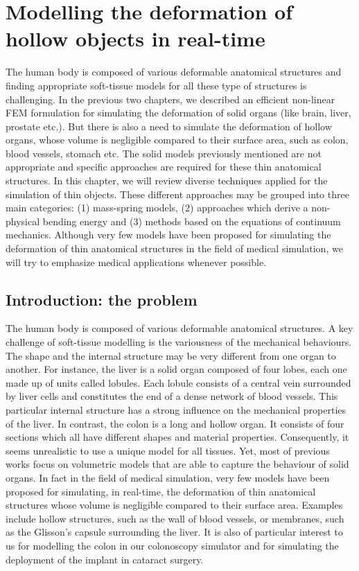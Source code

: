 \chapter[Modelling the deformation of hollow objects in real-time][Modelling hollow objects in real-time]{Modelling the deformation of hollow objects in real-time}
\label{chap7}
\begin{shortAbstract}
The human body is composed of various deformable anatomical structures and finding appropriate soft-tissue models for all these type of structures is challenging. In the previous two chapters, we described an efficient non-linear FEM formulation for simulating the deformation of solid organs (like brain, liver, prostate etc.). But there is also a need to simulate the deformation of hollow organs, whose volume is negligible compared to their surface area, such as colon, blood vessels, stomach etc. The solid models previously mentioned are not appropriate and specific approaches are required for these thin anatomical structures. In this chapter, we will review diverse techniques applied for the simulation of thin objects. These different approaches may be grouped into three main categories: (1) mass-spring models, (2) approaches which derive a non-physical bending energy and (3) methods based on the equations of continuum mechanics. Although very few models have been proposed for simulating the deformation of thin anatomical structures in the field of medical simulation, we will try to emphasize medical applications whenever possible. 
\end{shortAbstract}


\section{Introduction: the problem}
The human body is composed of various deformable anatomical structures. A key challenge of soft-tissue modelling is the variousness of the mechanical behaviours. The shape and the internal structure may be very different from one organ to another. For instance, the liver is a solid organ composed of four lobes, each one made up of units called lobules. Each lobule consists of a central vein surrounded by liver cells and constitutes the end of a dense network of blood vessels. This particular internal structure has a strong influence on the mechanical properties of the liver. In contrast, the colon is a long and hollow organ. It consists of four sections which all have different shapes and material properties. Consequently, it seems unrealistic to use a unique model for all tissues. Yet, most of previous works focus on volumetric models that are able to capture the behaviour of solid organs. In fact in the field of medical simulation, very few models have been proposed for simulating, in real-time, the deformation of thin anatomical structures whose volume is negligible compared to their surface area. Examples include hollow structures, such as the wall of blood vessels, or membranes, such as the Glisson's capsule surrounding the liver. It is also of particular interest to us for modelling the colon in our colonoscopy simulator and for simulating the deployment of the implant in cataract surgery. 

